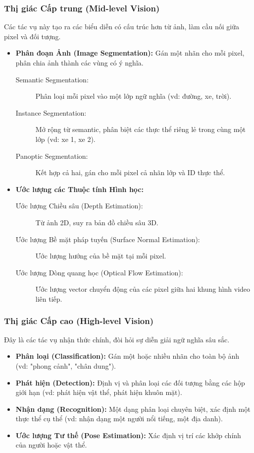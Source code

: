 \subsubsection{Thị giác Cấp trung (Mid-level Vision)}
Các tác vụ này tạo ra các biểu diễn có cấu trúc hơn từ ảnh, làm cầu nối giữa pixel và đối tượng.
\begin{itemize}
    \item \textbf{Phân đoạn Ảnh (Image Segmentation):} Gán một nhãn cho mỗi pixel, phân chia ảnh thành các vùng có ý nghĩa.
        \begin{description}
            \item[Semantic Segmentation:] Phân loại mỗi pixel vào một lớp ngữ nghĩa (vd: đường, xe, trời).
            \item[Instance Segmentation:] Mở rộng từ semantic, phân biệt các thực thể riêng lẻ trong cùng một lớp (vd: xe 1, xe 2).
            \item[Panoptic Segmentation:] Kết hợp cả hai, gán cho mỗi pixel cả nhãn lớp và ID thực thể.
        \end{description}
    \item \textbf{Ước lượng các Thuộc tính Hình học:}
        \begin{description}
            \item[Ước lượng Chiều sâu (Depth Estimation):] Từ ảnh 2D, suy ra bản đồ chiều sâu 3D.
            \item[Ước lượng Bề mặt pháp tuyến (Surface Normal Estimation):] Ước lượng hướng của bề mặt tại mỗi pixel.
            \item[Ước lượng Dòng quang học (Optical Flow Estimation):] Ước lượng vector chuyển động của các pixel giữa hai khung hình video liên tiếp.
        \end{description}
\end{itemize}

\subsubsection{Thị giác Cấp cao (High-level Vision)}
Đây là các tác vụ nhận thức chính, đòi hỏi sự diễn giải ngữ nghĩa sâu sắc.
\begin{itemize}
    \item \textbf{Phân loại (Classification):} Gán một hoặc nhiều nhãn cho toàn bộ ảnh (vd: "phong cảnh", "chân dung").
    \item \textbf{Phát hiện (Detection):} Định vị và phân loại các đối tượng bằng các hộp giới hạn (vd: phát hiện vật thể, phát hiện khuôn mặt).
    \item \textbf{Nhận dạng (Recognition):} Một dạng phân loại chuyên biệt, xác định một thực thể cụ thể (vd: nhận dạng một người nổi tiếng, một địa danh).
    \item \textbf{Ước lượng Tư thế (Pose Estimation):} Xác định vị trí các khớp chính của người hoặc vật thể.
\end{itemize}

